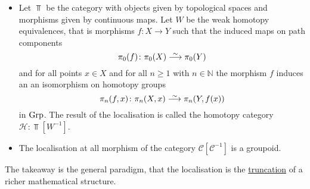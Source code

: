 \begin{exmp}
    \begin{itemize}
        \item 
        Let $\Top$ be the category with objects given by topological spaces and morphisms given by continuous maps.
        Let $W$ be the weak homotopy equivalences, that is morphisms $f:X \to Y$ such that the induced maps on path components 
        \[
        \pi_0(f) \colon\pi_0(X) \isomorphism \pi_0(Y)
        \]
        and for all points $x \in X$ and for all $n\geq1$ with $n \in \mathbb{N}$ the morphism $f$ induces an an isomorphism on homotopy groups
        \[
        \pi_n(f,x) \colon \pi_n(X,x) \isomorphism \pi_n(Y,f(x))
        \]
        in $\operatorname{Grp}$.
        The result of the localisation is called the homotopy category $\mathcal{H}: \Top[W^{-1}]$.
        \item 
        The localisation at all morphism of the category $\mathcal{C}[\mathcal{C}^{-1}]$ is a groupoid.
    \end{itemize}
\end{exmp}

\begin{rmk}
    The takeaway is the general paradigm, that the localisation is the \underline{truncation} of a richer mathematical structure.
\end{rmk}


